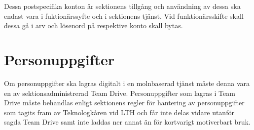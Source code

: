 \documentclass[10pt]{article}
\begin{document}
    Dessa postspecifika konton är sektionens tillgång och användning av dessa ska endast vara i fuktionärssyfte och i sektionens tjänst. 
    Vid funktionärsskifte skall dessa gå i arv och lösenord på respektive konto skall bytas. 
    
    
    \vspace{6px}
    \section{Personuppgifter}
    \vspace{6px}
    Om personuppgifter ska lagras digitalt i en molnbaserad tjänst måste denna vara en av sektionsadministrerad Team Drive. 
    Personuppgifter som lagras i Team Drive måste behandlas enligt sektionens regler för hantering av personuppgifter som tagits fram av Teknologkåren vid LTH och får inte delas vidare utanför sagda Team Drive samt inte laddas ner annat än för kortvarigt motiverbart bruk.
\end{document}
